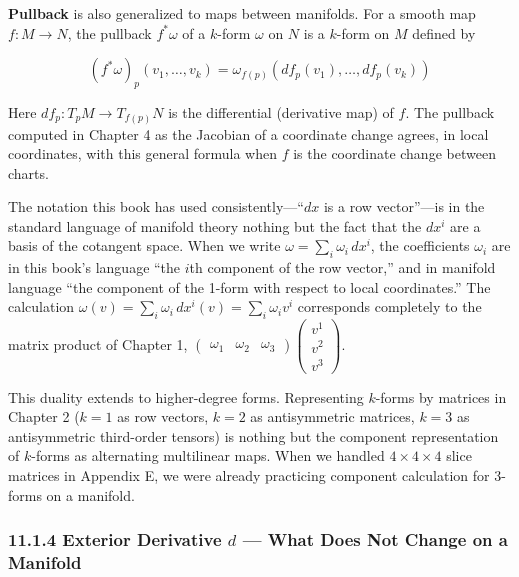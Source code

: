 \textbf{Pullback} is also generalized to maps between manifolds. For a
smooth map \(f: M \to N\), the pullback \(f^*\omega\) of a \(k\)-form
\(\omega\) on \(N\) is a \(k\)-form on \(M\) defined by

\[(f^*\omega)_p(v_1, \dots, v_k) = \omega_{f(p)}(df_p(v_1), \dots, df_p(v_k))\]

Here \(df_p: T_p M \to T_{f(p)} N\) is the differential (derivative map)
of \(f\). The pullback computed in Chapter 4 as the Jacobian of a
coordinate change agrees, in local coordinates, with this general
formula when \(f\) is the coordinate change between charts.

The notation this book has used consistently---``\(dx\) is a row
vector''---is in the standard language of manifold theory nothing but
the fact that the \(dx^i\) are a basis of the cotangent space. When we
write \(\omega = \sum_i \omega_i\,dx^i\), the coefficients \(\omega_i\)
are in this book's language ``the \(i\)th component of the row vector,''
and in manifold language ``the component of the 1-form with respect to
local coordinates.'' The calculation
\(\omega(v) = \sum_i \omega_i\,dx^i(v) = \sum_i \omega_i v^i\)
corresponds completely to the matrix product of Chapter 1,
\(\begin{pmatrix}\omega_1&\omega_2&\omega_3\end{pmatrix}\begin{pmatrix}v^1\\v^2\\v^3\end{pmatrix}\).

This duality extends to higher-degree forms. Representing \(k\)-forms by
matrices in Chapter 2 (\(k=1\) as row vectors, \(k=2\) as antisymmetric
matrices, \(k=3\) as antisymmetric third-order tensors) is nothing but
the component representation of \(k\)-forms as alternating multilinear
maps. When we handled \(4\times4\times4\) slice matrices in Appendix E,
we were already practicing component calculation for 3-forms on a
manifold.

\hypertarget{exterior-derivative-d-what-does-not-change-on-a-manifold}{%
\subsubsection{\texorpdfstring{11.1.4 Exterior Derivative \(d\) --- What
Does Not Change on a
Manifold}{11.1.4 Exterior Derivative d --- What Does Not Change on a Manifold}}\label{exterior-derivative-d-what-does-not-change-on-a-manifold}}

